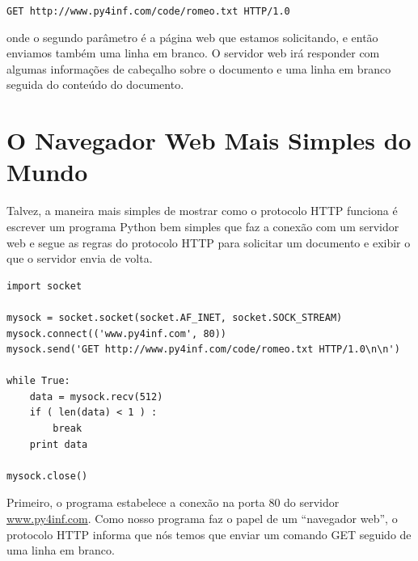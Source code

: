 {\tt GET http://www.py4inf.com/code/romeo.txt HTTP/1.0 }

onde o segundo parâmetro é a página web que estamos solicitando, e então
enviamos também uma linha em branco. O servidor web irá responder com
algumas informações de cabeçalho sobre o documento e uma linha em branco seguida
do conteúdo do documento.

\section{O Navegador Web Mais Simples do Mundo}

Talvez, a maneira mais simples de mostrar como o protocolo HTTP funciona é
escrever um programa Python bem simples que faz a conexão com um servidor web
e segue as regras do protocolo HTTP para solicitar um documento e exibir o
que o servidor envia de volta.

\beforeverb
\begin{verbatim}
import socket

mysock = socket.socket(socket.AF_INET, socket.SOCK_STREAM)
mysock.connect(('www.py4inf.com', 80))
mysock.send('GET http://www.py4inf.com/code/romeo.txt HTTP/1.0\n\n')

while True:
    data = mysock.recv(512)
    if ( len(data) < 1 ) :
        break
    print data

mysock.close()
\end{verbatim}
\afterverb

Primeiro, o programa estabelece a conexão na porta 80 do 
servidor \url{www.py4inf.com}. Como nosso programa faz o papel de um 
``navegador web'', o protocolo HTTP informa que nós temos que enviar um comando
GET seguido de uma linha em branco.


